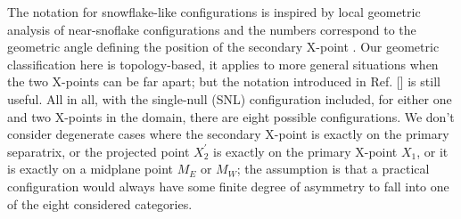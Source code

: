 The notation for snowflake-like configurations is inspired by local
geometric analysis of near-snoflake configurations and the numbers
correspond to the geometric angle defining the position of the
secondary X-point \cite{Ryutov2010}. Our geometric classification here
is topology-based, it applies to more general situations when the two
X-points can be far apart; but the notation introduced in
Ref. [\cite{Ryutov2010}] is still useful. All in all, with the
single-null (SNL) configuration included, for either one and two
X-points in the domain, there are eight possible configurations. We
don't consider degenerate cases where the secondary X-point is exactly
on the primary separatrix, or the projected point $X^{\prime}_2$ is
exactly on the primary X-point $X_1$, or it is exactly on a midplane
point $M_E$ or $M_W$; the assumption is that a practical configuration
would always have some finite degree of asymmetry to fall into one of
the eight considered categories.
